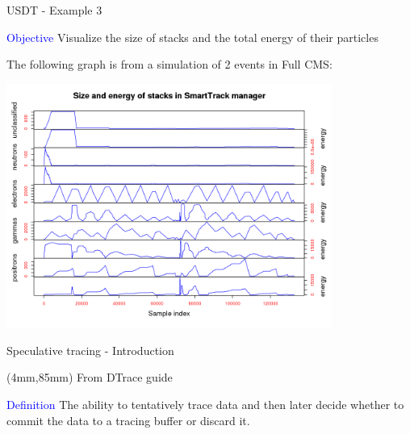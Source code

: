 \documentclass{beamer}
\newenvironment{reference}[2]{%
  \begin{textblock*}{\textwidth}(#1,#2) 
      \tiny\bgroup\color{red!50!black}}{\egroup\end{textblock*}}
\begin{document}
\begin{frame}{USDT - Example 3}

\textcolor{blue}{Objective} Visualize the size of stacks and the total energy of their particles

\vspace{1mm}

The following graph is from a simulation of 2 events in Full CMS:

\begin{center}
  \includegraphics[width=0.8\textwidth]{smarttracksize-ts-2evts-energy.png}
\end{center}
\end{frame}

\begin{frame}{Speculative tracing - Introduction}
\begin{reference}{4mm}{85mm}
From DTrace guide
\end{reference} 
\textcolor{blue}{Definition} The ability to tentatively trace data and then later decide whether to commit
the data to a tracing buffer or discard it.
\end{frame}
\end{document}
